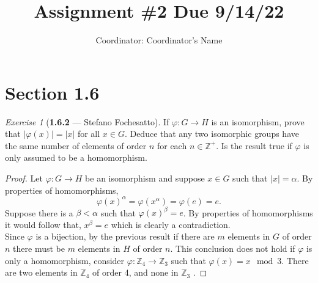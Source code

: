 \documentclass[12pt]{amsart}
\title{Assignment \#2 Due 9/14/22}
\author{Coordinator: Coordinator's Name}
\theoremstyle{remark}
\newtheorem*{exercise}{Exercise}%
\newcommand{\ZZ}{{\mathbb Z}}
\newcommand{\bsl}[1]{\texttt{\symbol{92}{\em #1}}} %
\theoremstyle{mycomment}
\newtheorem*{acomment}{\color{BrickRed}{Comment}}
\newcommand{\com}[1]{{\color{OliveGreen}\begin{acomment}{#1} %
\end{acomment}\noindent}}
\begin{document}
\maketitle
\doublespacing %


\section*{\textbf{Section 1.6}}


\begin{exercise}[\textbf{1.6.2} --- Stefano Fochesatto]If $\varphi: G \to H$ is an isomorphism, prove that $|\varphi(x)| = |x|$ for all $x \in G$. Deduce that any two 
  isomorphic groups have the same number of elements of order $n$ for each $n\in \ZZ^+$. Is the result true if $\varphi$ is only assumed to be a homomorphism.  
  \begin{proof} Let $\varphi: G \to H$ be an isomorphism and suppose $x \in G$ such that $|x| = \alpha$. By properties of homomorphisms,
    \begin{equation*}
        \varphi(x)^\alpha = \varphi(x^\alpha) = \varphi(e) = e. 
    \end{equation*}
    Suppose there is a $\beta < \alpha$ such that $\varphi(x)^{\beta} = e$. By properties of homomorphisms it would follow that, $x^\beta = e$ which is clearly a contradiction.\\
    Since $\varphi$ is a bijection, by the previous result if there are $m$ elements in $G$ of order $n$ there must be $m$ elements in $H$ of order $n$. This conclusion does not hold 
    if $\varphi$ is only a homomorphism, consider $\varphi: \ZZ_4 \to \ZZ_3$ such that $\varphi(x) = x \mod 3$. There are two elements in $\ZZ_4$ of order 4, and none in $\ZZ_3$ .
  \end{proof}
\end{exercise}
\vspace{.15in}
\end{document}
